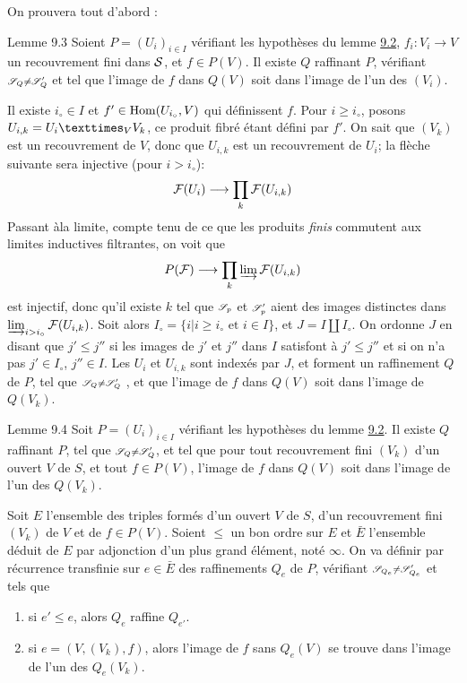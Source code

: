 \documentclass[10pt]{../fichiers-configuration-latex/smfart}
\begin{document}
On prouvera tout d'abord :

\begin{enonce*}{Lemme 9.3}
Soient $P = (U_i)_{i \in I}$ vérifiant les hypothèses du lemme \hyperref[VI.lem9.2]{9.2},
$f_i : V_i \to V$ un recouvrement fini dans $\Ss$, et $f \in P(V)$. Il
existe $Q$ raffinant $P$, vérifiant $\ss_Q \neq
\ss'_Q$ et tel que l'image de $f$ dans $Q(V)$ soit dans l'image de l'un des $(V_i)$.
\end{enonce*}

Il existe $i_{\circ} \in I$ et $f'\in \Hom(U_{i_{\circ}}, V)$ qui
définissent $f$. Pour $i \geq i_\circ$, posons $U_{i, k} =
\fprod{U_i}{V_k}{V}$, ce produit fibré étant défini par $f'$. On sait
que $(V_k)$ est un recouvrement de $V$, donc que $U_{i, k}$ est un
recouvrement de $U_i$; la flèche suivante sera injective (pour $i >
i_{\circ}$):
$$
\Ff (U_i) \to \prod_k \Ff (U_{i, k})
$$
Passant à\pageoriginale la limite, compte tenu de ce que les produits
\emph{finis} commutent aux limites inductives filtrantes, on voit que
$$
P(\Ff) \to \prod_k \varinjlim \Ff (U_{i, k})
$$
est injectif, donc qu'il existe $k$ tel que $\ss_p$ et
$\ss'_p$ aient des images distinctes dans $\varinjlim_{i > i_\circ} \Ff
(U_{i, k})$. Soit alors $I_{\circ} = \{i | i \geq i_{\circ} \mbox{ et }
  i \in I\}$, et $J = I \coprod I_{\circ}$. On ordonne $J$ en disant
que $j' \leq j''$ si les images de $j'$ et $j''$ dans $I$ satisfont à
$j' \leq j''$ et si on n'a pas $j' \in I_{\circ}$, $j''\in I$. Les
$U_i$ et $U_{i, k}$ sont indexés par $J$, et forment un raffinement $Q$ de $P$, tel
que $\ss_Q \neq \ss'_Q$ , et que l'image de $f$ dans
$Q(V)$ soit dans l'image de $Q(V_k)$.

\begin{enonce*}{Lemme 9.4}
Soit $P = (U_i)_{i \in I}$ vérifiant les hypothèses du lemme \hyperref[VI.lem9.2]{9.2}. Il
existe $Q$ raffinant $P$, tel que $\ss_Q \neq \ss'_Q$,
et tel que pour tout recouvrement fini $(V_k)$ d'un ouvert $V$ de $S$, et tout $f \in
P(V)$, l'image de $f$ dans $Q(V)$ soit dans l'image de l'un des $Q(V_k)$.
\end{enonce*}

Soit $E$ l'ensemble des triples formés d'un ouvert $V$ de $S$, d'un
recouvrement fini $(V_k)$ de $V$ et de $f \in P(V)$. Soient $\leq$
un bon ordre sur $E$ et $\bar{E}$ l'ensemble déduit de $E$ par
adjonction d'un plus grand élément, noté $\infty$. On va définir par
récurrence transfinie sur $e \in \bar{E}$ des raffinements $Q_e$ de
$P$, vérifiant $\ss_{Q_e} \neq \ss'_{Q_e}$ et tels que
\begin{enumerate}
\renewcommand{\theenumi}{\roman{enumi}}
\renewcommand{\labelenumi}{(\theenumi)}
\item si $e'\leq e$, alors $Q_e$ raffine $Q_{e'}$.

\item si $e = (V, (V_k), f)$, alors l'image de $f$ sans $Q_e(V)$ se
  trouve dans l'image de l'un des $Q_{e} (V_k)$.
\end{enumerate}
\end{document}
